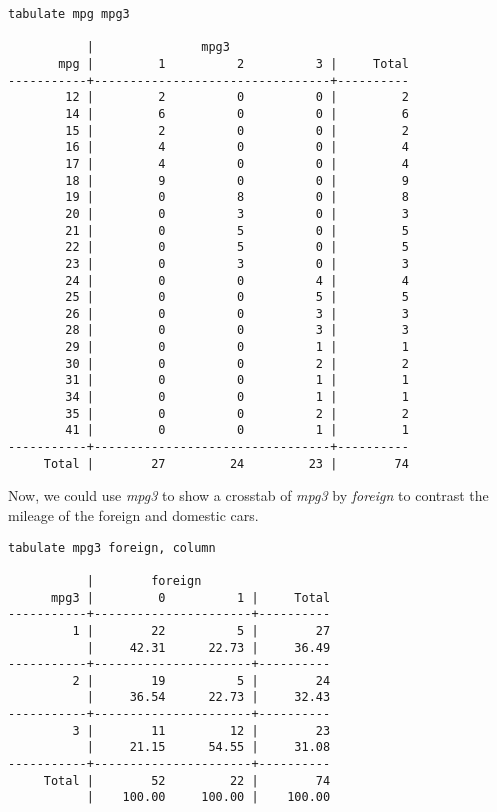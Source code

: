 \begin{lstlisting}
tabulate mpg mpg3

           |               mpg3
       mpg |         1          2          3 |     Total
-----------+---------------------------------+----------
        12 |         2          0          0 |         2
        14 |         6          0          0 |         6
        15 |         2          0          0 |         2
        16 |         4          0          0 |         4
        17 |         4          0          0 |         4
        18 |         9          0          0 |         9
        19 |         0          8          0 |         8
        20 |         0          3          0 |         3
        21 |         0          5          0 |         5
        22 |         0          5          0 |         5
        23 |         0          3          0 |         3
        24 |         0          0          4 |         4
        25 |         0          0          5 |         5
        26 |         0          0          3 |         3
        28 |         0          0          3 |         3
        29 |         0          0          1 |         1
        30 |         0          0          2 |         2
        31 |         0          0          1 |         1
        34 |         0          0          1 |         1
        35 |         0          0          2 |         2
        41 |         0          0          1 |         1
-----------+---------------------------------+----------
     Total |        27         24         23 |        74
\end{lstlisting}

Now, we could use \textit{mpg3} to show a crosstab of \textit{mpg3} by \textit{foreign} to contrast the mileage of the foreign and domestic cars.

\begin{lstlisting}
tabulate mpg3 foreign, column

           |        foreign
      mpg3 |         0          1 |     Total
-----------+----------------------+----------
         1 |        22          5 |        27
           |     42.31      22.73 |     36.49
-----------+----------------------+----------
         2 |        19          5 |        24
           |     36.54      22.73 |     32.43
-----------+----------------------+----------
         3 |        11         12 |        23
           |     21.15      54.55 |     31.08
-----------+----------------------+----------
     Total |        52         22 |        74
           |    100.00     100.00 |    100.00
\end{lstlisting}

